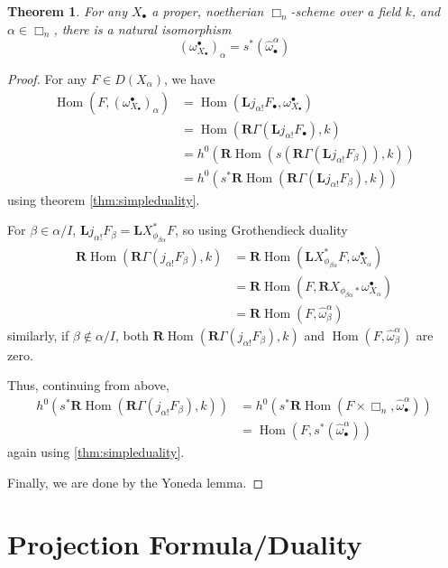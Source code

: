 \documentclass[proquest]{uwthesis}[2014/11/13]
\newtheorem{theorem}{Theorem}[section]
\theoremstyle{definition}
\DeclareMathOperator{\Hom}{Hom}
\newcommand{\bL}{\textbf{L}}
\newcommand{\bR}{\textbf{R}}
\begin{document}
\begin{theorem}
	For any $X_\bullet$ a proper, noetherian $\Box_n$-scheme over a field $k$, and $\alpha \in \Box_n$, there is a natural isomorphism
	\[
		(\omega_{X_\bullet}^\bullet)_\alpha = s^*(\hat{\omega}^\alpha_\bullet)
	\]
\end{theorem}
\begin{proof}
	For any $F \in D(X_\alpha)$, we have 
	\begin{align*}
	\Hom(F, (\omega_{X_\bullet}^\bullet)_\alpha) &= \Hom(\bL j_{\alpha !} F_\bullet, \omega_{X_\bullet}^\bullet) \\
	&= \Hom(\bR \Gamma(\bL j_{\alpha !} F_\bullet), k) \\
	&= h^0(\bR \Hom(s(\bR \Gamma (\bL j_{\alpha !} F_\beta)),k)) \\
	&= h^0(s^* \bR \Hom(\bR \Gamma(\bL j_{\alpha !} F_\beta), k))
	\end{align*}
	using theorem \ref{thm:simpleduality}.
	
	For $\beta \in \alpha / I$, $\bL j_{\alpha !} F_\beta = \bL X_{\phi_{\beta \alpha}}^* F$, so using Grothendieck duality
	\begin{align*}
		\bR \Hom(\bR \Gamma(j_{\alpha !} F_\beta),k)  &= \bR \Hom(\bL X_{\phi_{\beta \alpha}}^* F, \omega_{X_\alpha}^\bullet) \\
		&= \bR \Hom(F, \bR X_{\phi_{\beta \alpha} *} \omega_{X_\alpha}^\bullet) \\
		&= \bR \Hom(F, \hat{\omega}^\alpha_\beta)
	\end{align*}
	similarly, if $\beta \not \in \alpha / I$, both $\bR \Hom(\bR \Gamma(j_{\alpha !} F_\beta), k)$ and $\Hom(F, \hat{\omega}^\alpha_\beta)$ are zero.
	
	Thus, continuing from above,
	\begin{align*}
		h^0(s^* \bR \Hom(\bR \Gamma(j_{\alpha !} F_\beta), k)) &= h^0(s^* \bR \Hom(F \times \Box_n, \hat{\omega}^\alpha_\bullet)) \\
		&= \Hom(F, s^*(\hat{\omega}^\alpha_\bullet))
	\end{align*}
	again using \ref{thm:simpleduality}.
	
	Finally, we are done by the Yoneda lemma.
\end{proof}

\section{Projection Formula/Duality}
\end{document}
